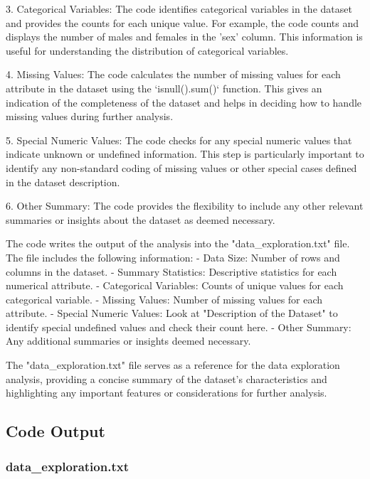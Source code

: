 \documentclass[11pt]{article}
\begin{document}
3. Categorical Variables: The code identifies categorical variables in the dataset and provides the counts for each unique value. For example, the code counts and displays the number of males and females in the 'sex' column. This information is useful for understanding the distribution of categorical variables.

4. Missing Values: The code calculates the number of missing values for each attribute in the dataset using the `isnull().sum()` function. This gives an indication of the completeness of the dataset and helps in deciding how to handle missing values during further analysis.

5. Special Numeric Values: The code checks for any special numeric values that indicate unknown or undefined information. This step is particularly important to identify any non-standard coding of missing values or other special cases defined in the dataset description.

6. Other Summary: The code provides the flexibility to include any other relevant summaries or insights about the dataset as deemed necessary.

The code writes the output of the analysis into the "data\_exploration.txt" file. The file includes the following information:
- Data Size: Number of rows and columns in the dataset.
- Summary Statistics: Descriptive statistics for each numerical attribute.
- Categorical Variables: Counts of unique values for each categorical variable.
- Missing Values: Number of missing values for each attribute.
- Special Numeric Values: Look at "Description of the Dataset" to identify special undefined values and check their count here.
- Other Summary: Any additional summaries or insights deemed necessary.

The "data\_exploration.txt" file serves as a reference for the data exploration analysis, providing a concise summary of the dataset's characteristics and highlighting any important features or considerations for further analysis.

\subsection{Code Output}

\subsubsection*{data\_exploration.txt}
\end{document}
